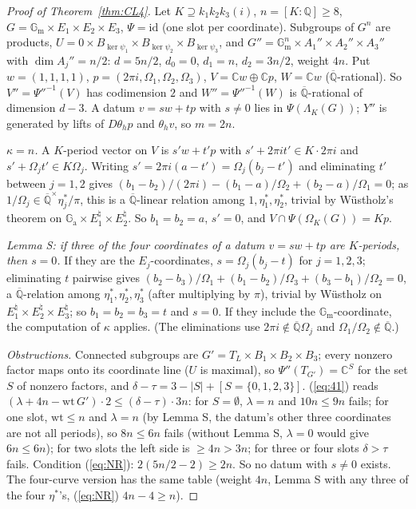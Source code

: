 \documentclass[11pt]{amsart}
\theoremstyle{definition}
\newcommand{\Qb}{\overline{\mathbb{Q}}}
\newcommand{\C}{\mathbb{C}}
\newcommand{\Q}{\mathbb{Q}}
\newcommand{\Ga}{\mathbb{G}_{\mathrm a}}
\newcommand{\Gm}{\mathbb{G}_{\mathrm m}}
\begin{document}
\begin{proof}[Proof of Theorem~\ref{thm:CL4}]
Let $K\supseteq k_1k_2k_3(i)$, $n=[K:\Q]\ge8$, $G=\Gm\times E_1\times E_2\times E_3$, $\Psi=\mathrm{id}$ (one slot per
coordinate). Subgroups of $G^n$ are products, $U=0\times B_{\ker\psi_1}\times B_{\ker\psi_2}\times B_{\ker\psi_3}$, and
$G''=\Gm^n\times A_1''\times A_2''\times A_3''$ with $\dim A_j''=n/2$: $d=5n/2$, $d_0=0$, $d_1=n$, $d_2=3n/2$, weight $4n$. Put
$w=(1,1,1,1)$, $p=(2\pi i,\Omega_1,\Omega_2,\Omega_3)$, $V=\C w\oplus\C p$, $W=\C w$ ($\Qb$-rational). So $V''=\Psi''^{-1}(V)$
has codimension $2$ and $W''=\Psi''^{-1}(W)$ is $\Qb$-rational of dimension $d-3$. A datum $v=sw+tp$ with $s\ne0$ lies in
$\Psi(\Lambda_K(G))$; $Y''$ is generated by lifts of $D\theta_hp$ and $\theta_hv$, so $m=2n$.

\emph{$\kappa=n$.} A $K$-period vector on $V$ is $s'w+t'p$ with $s'+2\pi it'\in K\cdot2\pi i$ and $s'+\Omega_jt'\in K\Omega_j$.
Writing $s'=2\pi i(a-t')=\Omega_j(b_j-t')$ and eliminating $t'$ between $j=1,2$ gives
$(b_1-b_2)/(2\pi i)-(b_1-a)/\Omega_2+(b_2-a)/\Omega_1=0$; as $1/\Omega_j\in\Qb^\times\eta_j^*/\pi$, this is a $\Qb$-linear relation
among $1,\eta_1^*,\eta_2^*$, trivial by W\"ustholz's theorem on $\Ga\times E_1^\natural\times E_2^\natural$. So $b_1=b_2=a$,
$s'=0$, and $V\cap\Psi(\Omega_K(G))=Kp$.

\emph{Lemma S: if three of the four coordinates of a datum $v=sw+tp$ are $K$-periods, then $s=0$.} If they are the
$E_j$-coordinates, $s=\Omega_j(b_j-t)$ for $j=1,2,3$; eliminating $t$ pairwise gives
$(b_2-b_3)/\Omega_1+(b_1-b_2)/\Omega_3+(b_3-b_1)/\Omega_2=0$, a $\Qb$-relation among $\eta_1^*,\eta_2^*,\eta_3^*$ (after
multiplying by $\pi$), trivial by W\"ustholz on $E_1^\natural\times E_2^\natural\times E_3^\natural$; so $b_1=b_2=b_3=t$ and $s=0$.
If they include the $\Gm$-coordinate, the computation of $\kappa$ applies. (The eliminations use $2\pi i\notin\Qb\Omega_j$ and
$\Omega_1/\Omega_2\notin\Qb$.)

\emph{Obstructions.} Connected subgroups are $G'=T_L\times B_1\times B_2\times B_3$; every nonzero factor maps onto its
coordinate line ($U$ is maximal), so $\Psi''(T_{G'})=\C^S$ for the set $S$ of nonzero factors, and
$\delta-\tau=3-|S|+[S=\{0,1,2,3\}]$. (\ref{eq:41}) reads $(\lambda+4n-\mathrm{wt}\,G')\cdot2\le(\delta-\tau)\cdot3n$:
for $S=\emptyset$, $\lambda=n$ and $10n\le9n$ fails; for one slot, $\mathrm{wt}\le n$ and $\lambda=n$ (by Lemma S, the datum's
other three coordinates are not all periods), so $8n\le6n$ fails (without Lemma S, $\lambda=0$ would give $6n\le6n$); for two
slots the left side is $\ge4n>3n$; for three or four slots $\delta>\tau$ fails. Condition (\ref{eq:NR}):
$2(5n/2-2)\ge2n$. So no datum with $s\ne0$ exists. The four-curve version has the same table (weight $4n$, Lemma S with any
three of the four $\eta^*$'s, (\ref{eq:NR}) $4n-4\ge n$).
\end{proof}
\end{document}

